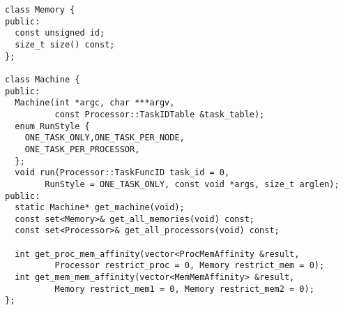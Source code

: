 



\begin{lstlisting}[float={t},label={lst:machineapi},caption={Machine Interface.}]
class Memory {
public:
  const unsigned id;
  size_t size() const;
};

class Machine {
public:
  Machine(int *argc, char ***argv,
          const Processor::TaskIDTable &task_table);
  enum RunStyle {
    ONE_TASK_ONLY,ONE_TASK_PER_NODE,
    ONE_TASK_PER_PROCESSOR,
  };
  void run(Processor::TaskFuncID task_id = 0, 
        RunStyle = ONE_TASK_ONLY, const void *args, size_t arglen);
public:
  static Machine* get_machine(void);
  const set<Memory>& get_all_memories(void) const;
  const set<Processor>& get_all_processors(void) const;

  int get_proc_mem_affinity(vector<ProcMemAffinity &result,
          Processor restrict_proc = 0, Memory restrict_mem = 0);
  int get_mem_mem_affinity(vector<MemMemAffinity> &result,
          Memory restrict_mem1 = 0, Memory restrict_mem2 = 0);
};
\end{lstlisting}


